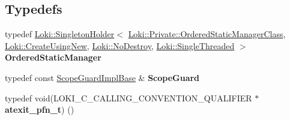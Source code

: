 \subsection*{Typedefs}
\begin{DoxyCompactItemize}
\item 
\hypertarget{namespaceLoki_ab18faec09c9bdcb0d5afeff007c34a4b}{}typedef \hyperlink{classLoki_1_1SingletonHolder}{Loki\+::\+Singleton\+Holder}$<$ \hyperlink{classLoki_1_1Private_1_1OrderedStaticManagerClass}{Loki\+::\+Private\+::\+Ordered\+Static\+Manager\+Class}, \hyperlink{structLoki_1_1CreateUsingNew}{Loki\+::\+Create\+Using\+New}, \hyperlink{structLoki_1_1NoDestroy}{Loki\+::\+No\+Destroy}, \hyperlink{classLoki_1_1SingleThreaded}{Loki\+::\+Single\+Threaded} $>$ {\bfseries Ordered\+Static\+Manager}\label{namespaceLoki_ab18faec09c9bdcb0d5afeff007c34a4b}

\item 
\hypertarget{group__ExceptionGroup_ga604eab98707ec8dd7033e34bb04c3257}{}typedef const \hyperlink{classLoki_1_1ScopeGuardImplBase}{Scope\+Guard\+Impl\+Base} \& {\bfseries Scope\+Guard}\label{group__ExceptionGroup_ga604eab98707ec8dd7033e34bb04c3257}

\item 
\hypertarget{namespaceLoki_a98885e7849be8ae1f82bba122e19e36b}{}typedef void(L\+O\+K\+I\+\_\+\+C\+\_\+\+C\+A\+L\+L\+I\+N\+G\+\_\+\+C\+O\+N\+V\+E\+N\+T\+I\+O\+N\+\_\+\+Q\+U\+A\+L\+I\+F\+I\+E\+R $\ast$ {\bfseries atexit\+\_\+pfn\+\_\+t}) ()\label{namespaceLoki_a98885e7849be8ae1f82bba122e19e36b}

\end{DoxyCompactItemize}
